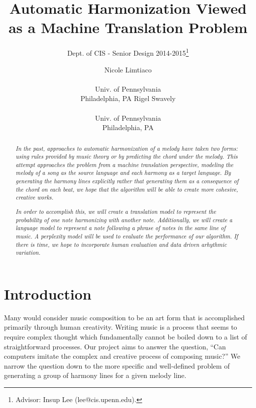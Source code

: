 \documentclass{sig-alternate}
\begin{document}
 

\title{Automatic Harmonization Viewed as a Machine Translation Problem}
\subtitle{Dept. of CIS - Senior Design 2014-2015\thanks{Advisor: Insup Lee (lee@cis.upenn.edu).}}
\author{
\alignauthor Nicole Limtiaco \\  \\ Univ. of Pennsylvania \\ Philadelphia, PA
\alignauthor Rigel Swavely \\  \\ Univ. of Pennsylvania \\ Philadelphia, PA}
\date{}
\maketitle

\begin{abstract}
  \textit{In the past, approaches to automatic harmonization of a melody
  have taken two forms: using rules provided by music theory or by predicting
  the chord under the melody. This attempt approaches the problem from a machine translation perspective, 
  modeling the melody of a song as the source language and each harmony as a target language.
  By generating the harmony lines explicitly rather that generating them as a
  consequence of the chord on each beat, we hope that the algorithm will be able to create
  more cohesive, creative works.}

  \textit{In order to accomplish this, we will create a translation model to represent the probability
  of one note harmonizing with another note. Additionally, we will create a language model to represent
  a note following a phrase of notes in the same line of music. A perplexity model will be used to 
  evaluate the performance of our algorithm. If there is time, we hope to incorporate human evaluation
  and data driven arhythmic variation.}
\end{abstract}

\section{Introduction}
\label{sec:intro}
Many would consider music composition to be an art form that is accomplished
primarily through human creativity. Writing music is a process that seems to require
complex thought which fundamentally cannot be boiled down to a list of straightforward
processes. Our project aims to answer the question, ``Can computers imitate the complex
and creative process of composing music?'' We narrow the question down to the more specific
and well-defined problem of generating a group of harmony lines for a given melody line.
\end{document}
